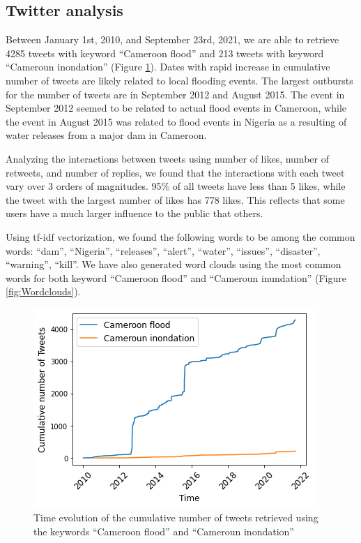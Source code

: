 \subsection{Twitter analysis}
Between January 1st, 2010, and September 23rd, 2021, we are able to retrieve 4285 tweets with keyword “Cameroon flood” and 213 tweets with keyword “Cameroun inondation” (Figure \ref{fig:timeevolutioncumulation}). Dates with rapid increase in cumulative number of tweets are likely related to local flooding events. The largest outbursts for the number of tweets are in September 2012 and August 2015. The event in September 2012 seemed to be related to actual flood events in Cameroon, while the event in August 2015 was related to flood events in Nigeria as a resulting of water releases from a major dam in Cameroon. 

Analyzing the interactions between tweets using number of likes, number of retweets, and number of replies, we found that the interactions with each tweet vary over 3 orders of magnitudes. 95\% of all tweets have less than 5 likes, while the tweet with the largest number of likes has 778 likes. This reflects that some users have a much larger influence to the public that others.

Using tf-idf vectorization, we found the following words to be among the common words: “dam”, “Nigeria”, “releases”, “alert”, “water”, “issues”, “disaster”, “warning”, “kill”. We have also generated word clouds using the most common words for both keyword “Cameroon flood” and “Cameroun inundation” (Figure \ref{fig:Wordclouds}). 

\begin{figure}[hbt!]
	\centering
	\includegraphics[width=0.8\linewidth]{figure/timeevolutioncumulation.png}
	\caption{Time evolution of the cumulative number of tweets retrieved using the keywords “Cameroon flood” and “Cameroun inondation”}
	\label{fig:timeevolutioncumulation}
\end{figure}

